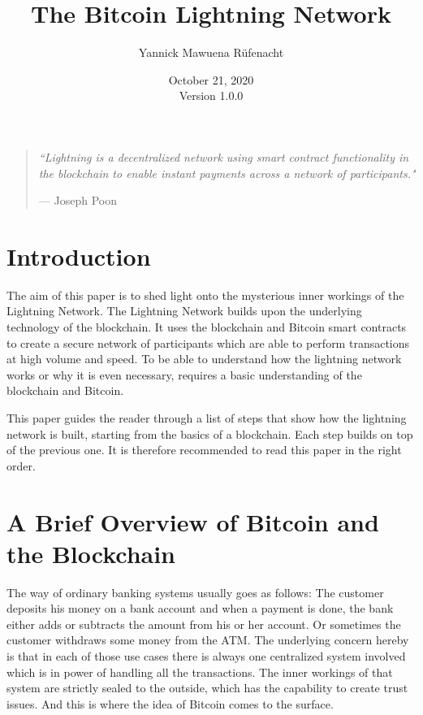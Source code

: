 \documentclass[a4paper, 12pt]{report}
\begin{document}
\title{\Large{\textbf{The Bitcoin Lightning Network}}}
\author{Yannick Mawuena Rüfenacht}
\date{October 21, 2020\\Version 1.0.0}
\maketitle

\begin{quote}
\vspace*{\fill}
\textit{``Lightning is a decentralized network using smart contract functionality in the blockchain to enable instant payments across a network of participants."}
\par\raggedleft--- \textup{Joseph Poon}
\vspace*{\fill}
\end{quote}

\tableofcontents
\pagebreak

\setlength{\parskip}{1em}
\setlength{\parindent}{0em}

\chapter{Introduction}
\par The aim of this paper is to shed light onto the mysterious inner workings of the Lightning Network. The Lightning Network builds upon the underlying technology of the blockchain. It uses the blockchain and Bitcoin smart contracts to create a secure network of participants which are able to perform transactions at high volume and speed. To be able to understand how the lightning network works or why it is even necessary, requires a basic understanding of the blockchain and Bitcoin.
\par This paper guides the reader through a list of steps that show how the lightning network is built, starting from the basics of a blockchain. Each step builds on top of the previous one. It is therefore recommended to read this paper in the right order.

\chapter{A Brief Overview of Bitcoin and the Blockchain}
\par The way of ordinary banking systems usually goes as follows: The customer deposits his money on a bank account and when a payment is done, the bank either adds or subtracts the amount from his or her account. Or sometimes the customer withdraws some money from the ATM. The underlying concern hereby is that in each of those use cases there is always one centralized system involved which is in power of handling all the transactions. The inner workings of that system are strictly sealed to the outside, which has the capability to create trust issues. And this is where the idea of Bitcoin comes to the surface.
\end{document}
